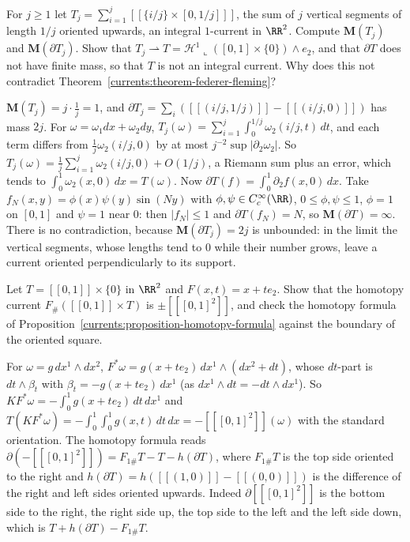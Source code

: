 \begin{exercise}\label{currents:exercise-boundary-bound}
For $j \geq 1$ let $T_j = \sum_{i=1}^{j}[\![\{i/j\} \times [0, 1/j]]\!]$, the sum of $j$ vertical segments of length $1/j$ oriented upwards, an integral $1$-current in $\RR^2$. Compute $\mathbf{M}(T_j)$ and
$\mathbf{M}(\partial T_j)$. Show that $T_j \rightharpoonup T = \mathcal{H}^1\llcorner([0, 1] \times \{0\}) \wedge e_2$, and that $\partial T$ does not have finite mass, so that $T$ is not an integral current. Why does this not
contradict Theorem~\ref{currents:theorem-federer-fleming}?
\end{exercise}

\begin{solution}
$\mathbf{M}(T_j) = j \cdot \frac1j = 1$, and $\partial T_j = \sum_i([\![(i/j, 1/j)]\!] - [\![(i/j, 0)]\!])$ has mass $2j$. For $\omega = \omega_1dx + \omega_2dy$,
$T_j(\omega) = \sum_{i=1}^j\int_0^{1/j}\omega_2(i/j, t)\,dt$, and each term differs from $\frac1j\omega_2(i/j, 0)$ by at most $j^{-2}\sup|\partial_2\omega_2|$. So
$T_j(\omega) = \frac1j\sum_{i=1}^j\omega_2(i/j, 0) + O(1/j)$, a Riemann sum plus an error, which tends to $\int_0^1\omega_2(x, 0)\,dx = T(\omega)$. Now $\partial T(f) = \int_0^1\partial_2f(x, 0)\,dx$. Take
$f_N(x, y) = \phi(x)\psi(y)\sin(Ny)$ with $\phi, \psi \in C^\infty_c(\RR)$, $0 \leq \phi, \psi \leq 1$, $\phi = 1$ on $[0, 1]$ and $\psi = 1$ near $0$: then $|f_N| \leq 1$ and $\partial T(f_N) = N$, so
$\mathbf{M}(\partial T) = \infty$. There is no contradiction, because $\mathbf{M}(\partial T_j) = 2j$ is unbounded: in the limit the vertical segments, whose lengths tend to $0$ while their number grows, leave a
current oriented perpendicularly to its support.
\end{solution}

\begin{exercise}\label{currents:exercise-homotopy-segment}
Let $T = [\![0, 1]\!] \times \{0\}$ in $\RR^2$ and $F(x, t) = x + te_2$. Show that the homotopy current $F_\#([\![0, 1]\!] \times T)$ is $\pm[\![[0, 1]^2]\!]$, and check the homotopy formula of
Proposition~\ref{currents:proposition-homotopy-formula} against the boundary of the oriented square.
\end{exercise}

\begin{solution}
For $\omega = g\,dx^1 \wedge dx^2$, $F^*\omega = g(x + te_2)\,dx^1 \wedge (dx^2 + dt)$, whose $dt$-part is $dt \wedge \beta_t$ with $\beta_t = -g(x + te_2)\,dx^1$ (as $dx^1 \wedge dt = -dt \wedge dx^1$). So
$KF^*\omega = -\int_0^1g(x + te_2)\,dt\,dx^1$ and $T(KF^*\omega) = -\int_0^1\int_0^1g(x, t)\,dt\,dx = -[\![[0, 1]^2]\!](\omega)$ with the standard orientation. The homotopy formula reads
$\partial(-[\![[0, 1]^2]\!]) = F_{1\#}T - T - h(\partial T)$, where $F_{1\#}T$ is the top side oriented to the right and $h(\partial T) = h([\![(1, 0)]\!] - [\![(0, 0)]\!])$ is the difference of the right and left sides oriented
upwards. Indeed $\partial[\![[0, 1]^2]\!]$ is the bottom side to the right, the right side up, the top side to the left and the left side down, which is $T + h(\partial T) - F_{1\#}T$.
\end{solution}

